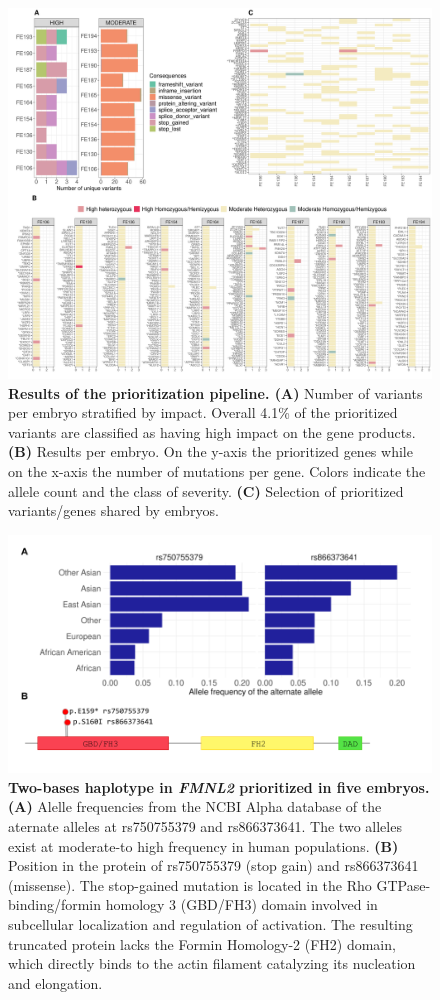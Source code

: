 \begin{figure}[ht]
\centering
\includegraphics[width=\linewidth]{fig/panel_EmbryoResults.png}
\caption{\textbf{Results of the prioritization pipeline. (A)} Number of variants per embryo stratified by impact. Overall 4.1\% of the prioritized variants are classified as having high impact on the gene products. \textbf{(B)} Results per embryo. On the y-axis the prioritized genes while on the x-axis the number of mutations per gene. Colors indicate the allele count and the class of severity. \textbf{(C)} Selection of prioritized variants/genes shared by embryos.}
\label{fig:resembryo}
\end{figure}

\begin{figure}[ht]
\centering
\includegraphics[width=\linewidth]{fig/fmnl2.png}
\caption{\textbf{Two-bases haplotype in \textit{FMNL2} prioritized in five embryos. (A)} Alelle frequencies from the NCBI Alpha database of the aternate alleles at rs750755379 and rs866373641. The two alleles exist at moderate-to high frequency in human populations. \textbf{(B)} Position in the protein of rs750755379 (stop gain) and rs866373641 (missense). The stop-gained mutation is located in the Rho GTPase-binding/formin homology 3 (GBD/FH3) domain involved in subcellular localization and regulation of activation. The resulting truncated protein lacks the Formin Homology-2 (FH2) domain, which directly binds to the actin filament catalyzing its nucleation and elongation. }
\label{fig:fmnl2}
\end{figure}